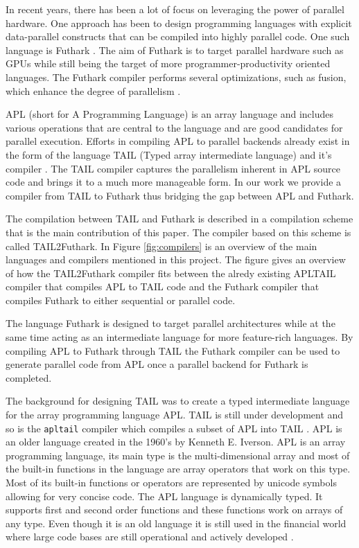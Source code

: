 \documentclass[11pt]{article}
\begin{document}
In recent years, there has been a lot of focus on leveraging the power of parallel hardware. 
One approach has been to design programming languages with explicit data-parallel constructs that can be compiled 
into highly parallel code. One such language is Futhark \cite{TroelsHenriksen}. The aim of Futhark is to target parallel hardware such as 
GPUs while still being the target of more programmer-productivity oriented languages. The Futhark compiler 
performs several optimizations, such as fusion, which enhance the degree of 
parallelism \cite{T.Henriksen&C.Oancea} \cite{T2graph} \cite{Hybrid}.

APL (short for A Programming Language) \cite{APLbook} is an array language and includes various operations that are central to the language and are good candidates 
for parallel execution. Efforts in compiling APL to parallel backends already exist in the form of the language 
TAIL (Typed array intermediate language) and it’s compiler \cite{ElsmanDybdal:Array:2014}.
The TAIL compiler captures the parallelism inherent in APL source code and brings it to a much more manageable form.
In our work we provide a compiler from TAIL 
to Futhark thus bridging the gap between APL and Futhark.

The compilation between TAIL and Futhark is described in a compilation scheme that is the main contribution of this paper.
The compiler based on this scheme is called TAIL2Futhark. 
In Figure \ref{fig:compilers} is an overview of the main languages and compilers mentioned in this project.
The figure gives an overview of how the TAIL2Futhark compiler fits between the alredy existing APLTAIL compiler that compiles APL to TAIL code and the Futhark compiler that compiles Futhark to either sequential or parallel code. 

The language Futhark is designed to target parallel architectures while at the same time acting 
as an intermediate language for more feature-rich languages.
By compiling APL to Futhark through TAIL the  Futhark compiler can be used to generate parallel code from APL once a parallel backend for Futhark is completed.

The background for designing TAIL was to create a typed intermediate language for the array programming language APL.
TAIL is still under development and so is the {\tt apltail} compiler which compiles a subset of APL into
TAIL \cite{ElsmanDybdal:Array:2014}.
APL is an older language created in the 1960's by Kenneth E. Iverson.
APL is an array programming language, its main type is the multi-dimensional array 
and most of the built-in functions in the language are array operators that work on this type. 
Most of its built-in functions or operators are represented by unicode symbols allowing for very concise code.
The APL language is dynamically typed. It supports first and second order functions and these functions work on arrays of any type. 
Even though it is an old language it is still used in the financial world 
where large code bases are still operational and actively developed \cite{ElsmanDybdal:Array:2014} \cite{Array:2015}.
\end{document}
